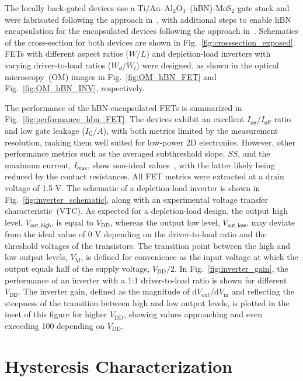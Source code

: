 \documentclass[conference]{IEEEtran}
\begin{document}
The locally back-gated devices use a Ti/Au–Al$_2$O$_3$–(hBN)-MoS$_2$ gate stack and were fabricated following the approach in~\cite{polyushkin_analogue_2020}, with additional steps to enable hBN encapsulation for the encapsulated devices following the approach in~\cite{piacentini_stable_2022}. Schematics of the cross-section for both devices are shown in Fig.~\ref{fig:crosssection_exposed}. FETs with different aspect ratios ($W/L$) and depletion-load inverters with varying driver-to-load ratios ($W_d/W_l$) were designed, as shown in the optical microscopy~(OM) images in Fig.~\ref{fig:OM_hBN_FET} and Fig.~\ref{fig:OM_hBN_INV}, respectively.

The performance of the hBN-encapsulated FETs is summarized in Fig.~\ref{fig:performance_hbn_FET}. The devices exhibit an excellent $I_\mathsf{on}/I_\mathsf{off}$ ratio and low gate leakage ($I_\mathsf{G}/A$), with both metrics limited by the measurement resolution, making them well suited for low-power 2D electronics. However, other performance metrics such as the averaged subthreshold slope, $SS$, and the maximum current, $I_\mathsf{max}$, show non-ideal values~\cite{IRDS2024}, with the latter likely being reduced by the contact resistances. All FET metrics were extracted at a drain voltage of 1.5 V. The schematic of a depletion-load inverter is shown in Fig.~\ref{fig:inverter_schematic}, along with an experimental voltage transfer characteristic~(VTC). As expected for a depletion-load design, the output high level, $V_\mathsf{out,high}$, is equal to $V_\mathrm{DD}$, whereas the output low level, $V_\mathsf{out,low}$, may deviate from the ideal value of 0 V depending on the driver-to-load ratio and the threshold voltages of the transistors. The transition point between the high and low output levels, $V_\mathrm{M}$, is defined for convenience as the input voltage at which the output equals half of the supply voltage, $V_\mathrm{DD}/2$. In Fig.~\ref{fig:inverter_gain}, the performance of an inverter with a 1:1 driver-to-load ratio is shown for different $V_\mathsf{DD}$. The inverter gain, defined as the magnitude of $\mathrm{d}V_\mathrm{out}/\mathrm{d}V_\mathrm{in}$ and reflecting the steepness of the transition between high and low output levels, is plotted in the inset of this figure for higher $V_\mathrm{DD}$, showing values approaching and even exceeding 100 depending on $V_\mathrm{DD}$. 

\section{Hysteresis Characterization}\label{sec:hysteresis}
\end{document}
